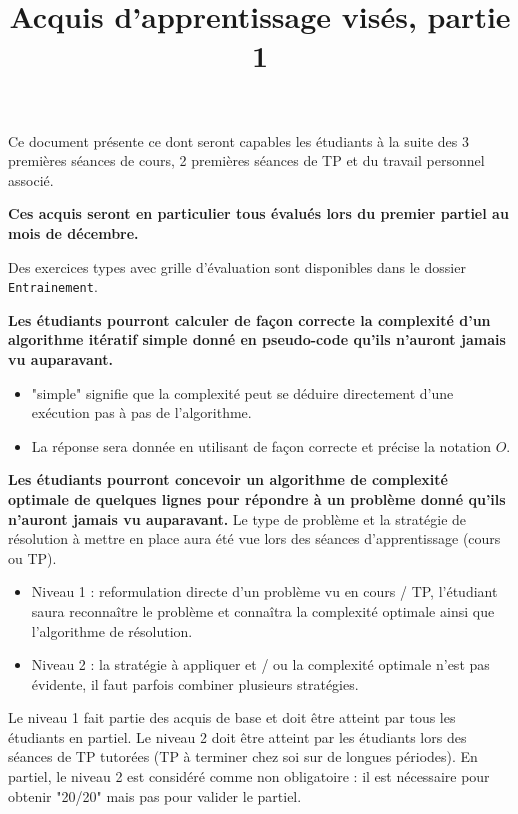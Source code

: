 \documentclass{../cours}
\title{Acquis d'apprentissage visés, partie 1}
\begin{document}
\maketitle

Ce document présente ce dont seront capables les étudiants à la suite des 3 premières séances de cours, 2 premières séances de TP et du travail personnel associé. 

\textbf{Ces acquis seront en particulier tous évalués lors du premier partiel au mois de décembre.}

Des exercices types avec grille d'évaluation sont disponibles dans le dossier \texttt{Entrainement}.

\begin{aav}
\textbf{Les étudiants pourront calculer de façon correcte la complexité d'un algorithme itératif simple donné en pseudo-code qu'ils n’auront jamais vu auparavant.} 
\begin{itemize}
\item "simple" signifie que la complexité peut se déduire directement d'une exécution pas à pas de l'algorithme.
\item La réponse sera donnée en utilisant de façon correcte et précise la notation $O$.
\end{itemize}
\end{aav}

\begin{aav}
\textbf{Les étudiants pourront concevoir un algorithme de complexité optimale de quelques lignes pour répondre à un problème donné qu'ils n'auront jamais vu auparavant.} Le type de problème et la stratégie de résolution à mettre en place aura été vue lors des séances d'apprentissage (cours ou TP). 
\begin{itemize}
\item Niveau 1 : reformulation directe d'un problème vu en cours / TP, l'étudiant saura reconnaître le problème et connaîtra la complexité optimale ainsi que l'algorithme de résolution.
\item Niveau 2 : la stratégie à appliquer et / ou la complexité optimale n'est pas évidente, il faut parfois combiner plusieurs stratégies. 
\end{itemize}

Le niveau 1 fait partie des acquis de base et doit être atteint par tous les étudiants en partiel. Le niveau 2 doit être atteint par les étudiants lors des séances de TP tutorées (TP à terminer chez soi sur de longues périodes). En partiel, le niveau 2 est considéré comme non obligatoire : il est nécessaire pour obtenir "20/20" mais pas pour valider le partiel.
\end{aav}
\end{document}
